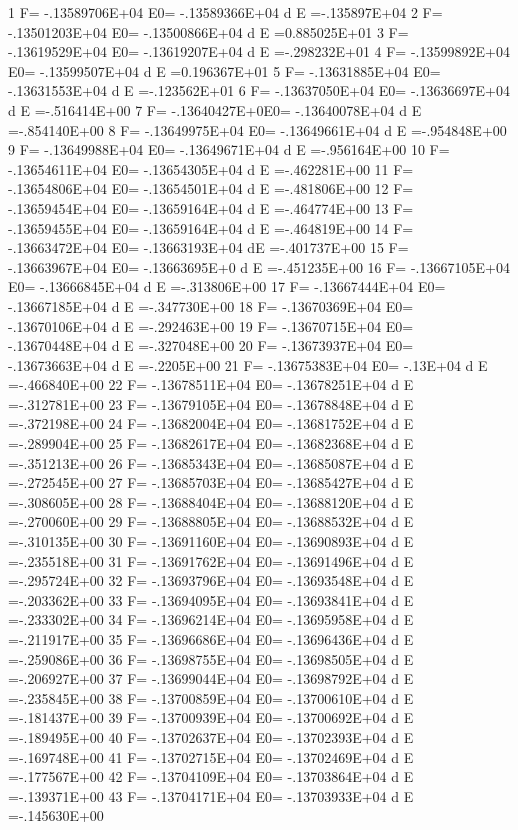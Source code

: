    1 F= -.13589706E+04 E0= -.13589366E+04  d E =-.135897E+04
   2 F= -.13501203E+04 E0= -.13500866E+04  d E =0.885025E+01
   3 F= -.13619529E+04 E0= -.13619207E+04  d E =-.298232E+01
   4 F= -.13599892E+04 E0= -.13599507E+04  d E =0.196367E+01
   5 F= -.13631885E+04 E0= -.13631553E+04  d E =-.123562E+01
   6 F= -.13637050E+04 E0= -.13636697E+04  d E =-.516414E+00
   7 F= -.13640427E+0E0= -.13640078E+04  d E =-.854140E+00
   8 F= -.13649975E+04 E0= -.13649661E+04  d E =-.954848E+00
   9 F= -.13649988E+04 E0= -.13649671E+04  d E =-.956164E+00
  10 F= -.13654611E+04 E0= -.13654305E+04  d E =-.462281E+00
  11 F= -.13654806E+04 E0= -.13654501E+04  d E =-.481806E+00
  12 F= -.13659454E+04 E0= -.13659164E+04  d E =-.464774E+00
  13 F= -.13659455E+04 E0= -.13659164E+04  d E =-.464819E+00
  14 F= -.13663472E+04 E0= -.13663193E+04  dE =-.401737E+00
  15 F= -.13663967E+04 E0= -.13663695E+0 d E =-.451235E+00
  16 F= -.13667105E+04 E0= -.13666845E+04  d E =-.313806E+00
  17 F= -.13667444E+04 E0= -.13667185E+04  d E =-.347730E+00
  18 F= -.13670369E+04 E0= -.13670106E+04  d E =-.292463E+00
  19 F= -.13670715E+04 E0= -.13670448E+04  d E =-.327048E+00
  20 F= -.13673937E+04 E0= -.13673663E+04  d E =-.2205E+00
  21 F= -.13675383E+04 E0= -.13E+04  d E =-.466840E+00
  22 F= -.13678511E+04 E0= -.13678251E+04  d E =-.312781E+00
  23 F= -.13679105E+04 E0= -.13678848E+04  d E =-.372198E+00
  24 F= -.13682004E+04 E0= -.13681752E+04  d E =-.289904E+00
  25 F= -.13682617E+04 E0= -.13682368E+04  d E =-.351213E+00
  26 F= -.13685343E+04 E0= -.13685087E+04  d E =-.272545E+00
  27 F= -.13685703E+04 E0= -.13685427E+04  d E =-.308605E+00
  28 F= -.13688404E+04 E0= -.13688120E+04  d E =-.270060E+00
  29 F= -.13688805E+04 E0= -.13688532E+04  d E =-.310135E+00
  30 F= -.13691160E+04 E0= -.13690893E+04  d E =-.235518E+00
  31 F= -.13691762E+04 E0= -.13691496E+04  d E =-.295724E+00
  32 F= -.13693796E+04 E0= -.13693548E+04  d E =-.203362E+00
  33 F= -.13694095E+04 E0= -.13693841E+04  d E =-.233302E+00
  34 F= -.13696214E+04 E0= -.13695958E+04  d E =-.211917E+00
  35 F= -.13696686E+04 E0= -.13696436E+04  d E =-.259086E+00
  36 F= -.13698755E+04 E0= -.13698505E+04  d E =-.206927E+00
  37 F= -.13699044E+04 E0= -.13698792E+04  d E =-.235845E+00
  38 F= -.13700859E+04 E0= -.13700610E+04  d E =-.181437E+00
  39 F= -.13700939E+04 E0= -.13700692E+04  d E =-.189495E+00
  40 F= -.13702637E+04 E0= -.13702393E+04  d E =-.169748E+00
  41 F= -.13702715E+04 E0= -.13702469E+04  d E =-.177567E+00
  42 F= -.13704109E+04 E0= -.13703864E+04  d E =-.139371E+00
  43 F= -.13704171E+04 E0= -.13703933E+04  d E =-.145630E+00
